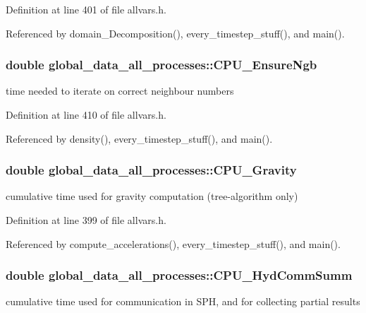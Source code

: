 Definition at line 401 of file allvars.h.



Referenced by domain\_\-Decomposition(), every\_\-timestep\_\-stuff(), and main().

\hypertarget{structglobal__data__all__processes_ad3447593858d4165b669b5e70b2521cd}{
\subsubsection[{CPU\_\-EnsureNgb}]{\setlength{\rightskip}{0pt plus 5cm}double {\bf global\_\-data\_\-all\_\-processes::CPU\_\-EnsureNgb}}}
\label{structglobal__data__all__processes_ad3447593858d4165b669b5e70b2521cd}
time needed to iterate on correct neighbour numbers 

Definition at line 410 of file allvars.h.



Referenced by density(), every\_\-timestep\_\-stuff(), and main().

\hypertarget{structglobal__data__all__processes_a27dce58feba6ff0e933ed6f24f857168}{
\subsubsection[{CPU\_\-Gravity}]{\setlength{\rightskip}{0pt plus 5cm}double {\bf global\_\-data\_\-all\_\-processes::CPU\_\-Gravity}}}
\label{structglobal__data__all__processes_a27dce58feba6ff0e933ed6f24f857168}
cumulative time used for gravity computation (tree-\/algorithm only) 

Definition at line 399 of file allvars.h.



Referenced by compute\_\-accelerations(), every\_\-timestep\_\-stuff(), and main().

\hypertarget{structglobal__data__all__processes_ad03842fb23d3c15316ca07c7ac1bce27}{
\subsubsection[{CPU\_\-HydCommSumm}]{\setlength{\rightskip}{0pt plus 5cm}double {\bf global\_\-data\_\-all\_\-processes::CPU\_\-HydCommSumm}}}
\label{structglobal__data__all__processes_ad03842fb23d3c15316ca07c7ac1bce27}
cumulative time used for communication in SPH, and for collecting partial results 


